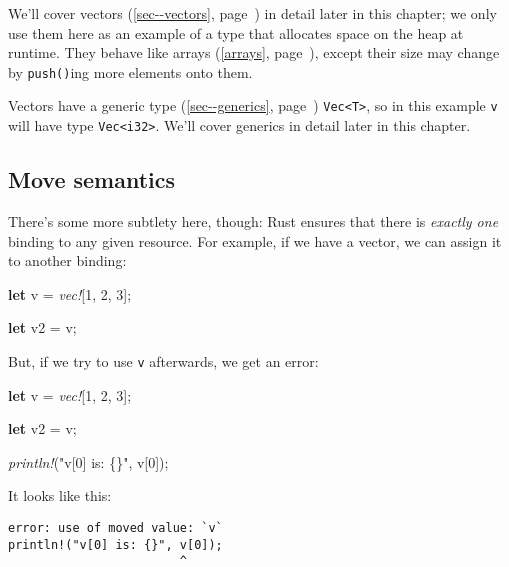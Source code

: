 \documentclass[a4paper,]{book}
\renewcommand*{\hyperlink}[2]{%
 #2 (\autoref{#1}, page~\pageref{#1})}
\newenvironment{Shaded}{\begin{snugshade}}{\end{snugshade}}
\newcommand{\KeywordTok}[1]{\textcolor[rgb]{0.13,0.29,0.53}{\textbf{{#1}}}}
\newcommand{\DecValTok}[1]{\textcolor[rgb]{0.00,0.00,0.81}{{#1}}}
\newcommand{\StringTok}[1]{\textcolor[rgb]{0.31,0.60,0.02}{{#1}}}
\newcommand{\PreprocessorTok}[1]{\textcolor[rgb]{0.56,0.35,0.01}{\textit{{#1}}}}
\newcommand{\NormalTok}[1]{{#1}}
\begin{document}
We'll cover \protect\hyperlink{sec--vectors}{vectors} in detail later in
this chapter; we only use them here as an example of a type that
allocates space on the heap at runtime. They behave like
\protect\hyperlink{arrays}{arrays}, except their size may change by
\texttt{push()}ing more elements onto them.

Vectors have a \protect\hyperlink{sec--generics}{generic type}
\texttt{Vec\textless{}T\textgreater{}}, so in this example \texttt{v}
will have type \texttt{Vec\textless{}i32\textgreater{}}. We'll cover
generics in detail later in this chapter.

\subsection{Move semantics}\label{move-semantics}

There's some more subtlety here, though: Rust ensures that there is
\emph{exactly one} binding to any given resource. For example, if we
have a vector, we can assign it to another binding:

\begin{Shaded}
\begin{Highlighting}[]
\KeywordTok{let} \NormalTok{v = }\PreprocessorTok{vec!}\NormalTok{[}\DecValTok{1}\NormalTok{, }\DecValTok{2}\NormalTok{, }\DecValTok{3}\NormalTok{];}

\KeywordTok{let} \NormalTok{v2 = v;}
\end{Highlighting}
\end{Shaded}

But, if we try to use \texttt{v} afterwards, we get an error:

\begin{Shaded}
\begin{Highlighting}[]
\KeywordTok{let} \NormalTok{v = }\PreprocessorTok{vec!}\NormalTok{[}\DecValTok{1}\NormalTok{, }\DecValTok{2}\NormalTok{, }\DecValTok{3}\NormalTok{];}

\KeywordTok{let} \NormalTok{v2 = v;}

\PreprocessorTok{println!}\NormalTok{(}\StringTok{"v[0] is: \{\}"}\NormalTok{, v[}\DecValTok{0}\NormalTok{]);}
\end{Highlighting}
\end{Shaded}

It looks like this:

\begin{verbatim}
error: use of moved value: `v`
println!("v[0] is: {}", v[0]);
                        ^
\end{verbatim}
\end{document}
